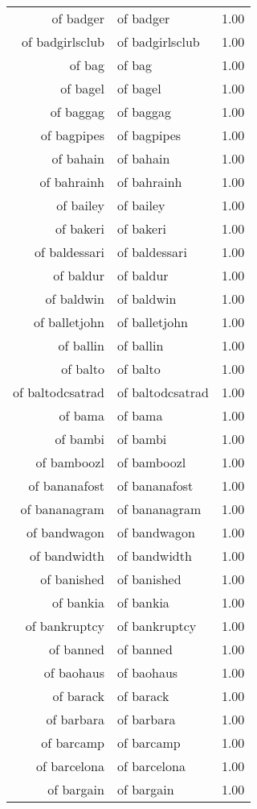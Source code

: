 \begin{table}[ht]
\begin{tabular}{rlr}
  of badger & of badger & 1.00 \\ 
  of badgirlsclub & of badgirlsclub & 1.00 \\ 
  of bag & of bag & 1.00 \\ 
  of bagel & of bagel & 1.00 \\ 
  of baggag & of baggag & 1.00 \\ 
  of bagpipes & of bagpipes & 1.00 \\ 
  of bahain & of bahain & 1.00 \\ 
  of bahrainh & of bahrainh & 1.00 \\ 
  of bailey & of bailey & 1.00 \\ 
  of bakeri & of bakeri & 1.00 \\ 
  of baldessari & of baldessari & 1.00 \\ 
  of baldur & of baldur & 1.00 \\ 
  of baldwin & of baldwin & 1.00 \\ 
  of balletjohn & of balletjohn & 1.00 \\ 
  of ballin & of ballin & 1.00 \\ 
  of balto & of balto & 1.00 \\ 
  of baltodcsatrad & of baltodcsatrad & 1.00 \\ 
  of bama & of bama & 1.00 \\ 
  of bambi & of bambi & 1.00 \\ 
  of bamboozl & of bamboozl & 1.00 \\ 
  of bananafost & of bananafost & 1.00 \\ 
  of bananagram & of bananagram & 1.00 \\ 
  of bandwagon & of bandwagon & 1.00 \\ 
  of bandwidth & of bandwidth & 1.00 \\ 
  of banished & of banished & 1.00 \\ 
  of bankia & of bankia & 1.00 \\ 
  of bankruptcy & of bankruptcy & 1.00 \\ 
  of banned & of banned & 1.00 \\ 
  of baohaus & of baohaus & 1.00 \\ 
  of barack & of barack & 1.00 \\ 
  of barbara & of barbara & 1.00 \\ 
  of barcamp & of barcamp & 1.00 \\ 
  of barcelona & of barcelona & 1.00 \\ 
  of bargain & of bargain & 1.00 \\ 

\end{tabular}
\end{table}
